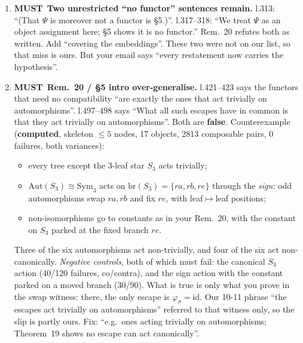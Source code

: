 \documentclass[10pt]{article}
\newcommand{\MU}{\textbf{MUST}}
\newcommand{\br}{\mathrm{br}}
\begin{document}
\begin{enumerate}[label=\textbf{C-M\arabic*}]
\item \MU\ \textbf{Two unrestricted ``no functor'' sentences remain.} l.313: ``(That $\Psi$ is moreover not a functor
is \S5.)''. l.317--318: ``We treat $\Psi$ as an object assignment here; \S5 shows it is no functor.'' Rem.~20 refutes
both as written. Add ``covering the embeddings''. These two were not on our list, so that miss is ours. But your
email says ``every restatement now carries the hypothesis''.
\item \MU\ \textbf{Rem.~20 / \S5 intro over-generalise.} l.421--423 says the functors that need no compatibility ``are
exactly the ones that act trivially on automorphisms''. l.497--498 says ``What all such escapes have in common is
that they act trivially on automorphisms''. Both are \textbf{false}. Counterexample (\textbf{computed}, skeleton
$\le5$ nodes, 17 objects, 2813 composable pairs, 0 failures, both variances):
\begin{itemize}
\item every tree except the 3-leaf star $S_3$ acts trivially;
\item $\mathrm{Aut}(S_3)\cong\mathrm{Sym}_3$ acts on $\br(S_3)=\{ra,rb,re\}$ through the \emph{sign}: odd automorphisms swap $ra,rb$
and fix $re$, with leaf$\mapsto$leaf positions;
\item non-isomorphisms go to constants as in your Rem.~20, with the constant on $S_3$ parked at the fixed branch $re$.
\end{itemize}
Three of the six automorphisms act non-trivially, and four of the six act non-canonically.
\emph{Negative controls}, both of which must fail: the canonical $S_3$ action (40/120 failures, co/contra), and the sign
action with the constant parked on a moved branch (30/90). What is true is only what you prove in the swap
witness: there, the only escape is $\varphi_\sigma=\mathrm{id}$. Our 10-11 phrase ``the escapes act trivially on
automorphisms'' referred to that witness only, so the slip is partly ours. Fix: ``e.g.\ ones acting trivially on
automorphisms; Theorem~19 shows no escape can act canonically''.
\end{enumerate}
\end{document}
